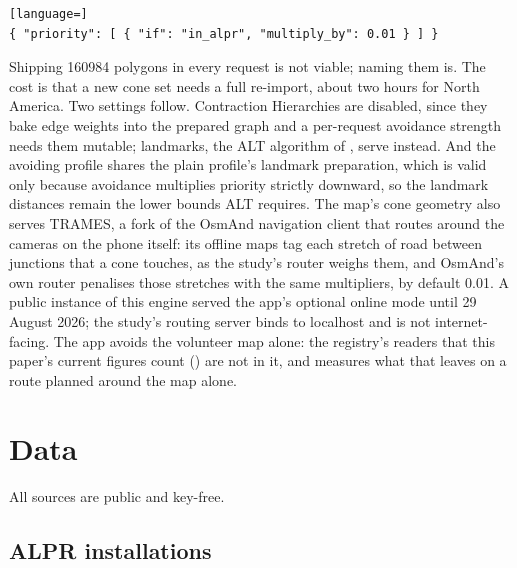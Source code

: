 \documentclass[11pt,twoside]{article}
\begin{document}
\begin{lstlisting}[language=]
{ "priority": [ { "if": "in_alpr", "multiply_by": 0.01 } ] }
\end{lstlisting}

\noindent
Shipping \num{160984} polygons in every request is not viable; naming them is. The cost is
that a new cone set needs a full re-import, about two hours for North America. Two settings
follow. Contraction Hierarchies \citep{geisberger2008} are disabled, since they bake edge
weights into the prepared graph and a per-request avoidance strength needs them mutable;
landmarks, the ALT algorithm of \citet{goldberg2005}, serve instead. And the avoiding profile
shares the plain profile's landmark preparation, which is valid only because avoidance
multiplies priority strictly downward, so the landmark distances remain the lower bounds ALT
requires. The map's cone geometry also serves TRAMES, a fork of the OsmAnd navigation client
\citep{osmand} that routes around the cameras on the phone itself: its offline maps tag each
stretch of road between junctions that a cone touches, as the study's router weighs them, and
OsmAnd's own router penalises those stretches with the same multipliers, by default
\num{0.01}. A
public instance of this engine served the app's optional online mode until 29 August 2026; the
study's routing server binds to localhost and is not internet-facing. The app avoids the
volunteer map alone: the registry's readers that this paper's current figures count
() are not in it, and  measures what that leaves
on a route planned around the map alone.

\section{Data}
\label{sec:data}

All sources are public and key-free.

\subsection{ALPR installations}
\label{sec:data:alpr}
\end{document}
